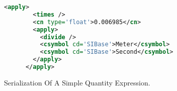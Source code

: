 \begin{figure}[h]
  \begin{center}
    \lstset{
      basicstyle=\footnotesize,
      xleftmargin=.2\textwidth, xrightmargin=.2\textwidth
    }

    \begin{lstlisting}[language=XML]
      <apply>
        <times />
        <cn type='float'>0.006985</cn>
        <apply>
          <divide />
          <csymbol cd='SIBase'>Meter</csymbol>
          <csymbol cd='SIBase'>Second</csymbol>
        </apply>
      </apply>
    \end{lstlisting}
  \end{center}
  \caption{Serialization Of A Simple Quantity Expression. }
  \label{fig:ser1}
\end{figure}
